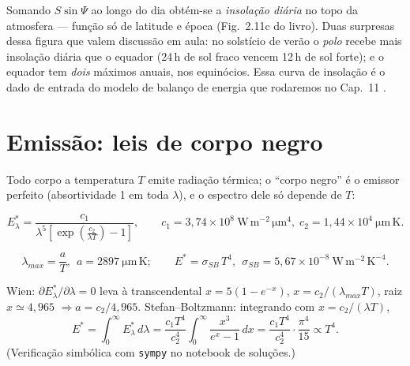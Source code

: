 \documentclass[11pt]{article}
\begin{document}
Somando $S\sin\Psi$ ao longo do dia obtém-se a \emph{insolação diária} no
topo da atmosfera — função só de latitude e época (Fig.~2.11c do livro).
Duas surpresas dessa figura que valem discussão em aula: no solstício de
verão o \emph{polo} recebe mais insolação diária que o equador (24\,h de
sol fraco vencem 12\,h de sol forte); e o equador tem \emph{dois} máximos
anuais, nos equinócios. Essa curva de insolação é o dado de entrada do
modelo de balanço de energia que rodaremos no Cap.~11
.

\section{Emissão: leis de corpo negro}\label{sec:corpo}


Todo corpo a temperatura $T$ emite radiação térmica; o ``corpo negro'' é o
emissor perfeito (absortividade 1 em toda $\lambda$), e o espectro dele só
depende de $T$:

\begin{formalivro}
\[ E^*_\lambda = \frac{c_1}{\lambda^5\left[\exp\!\left(\frac{c_2}{\lambda T}\right)-1\right]},
\qquad c_1 = 3{,}74\times10^{8}\ \mathrm{W\,m^{-2}\,\mu m^{4}},\;
        c_2 = 1{,}44\times10^{4}\ \mathrm{\mu m\,K}. \]
\end{formalivro}

\begin{formalivro}
\[ \lambda_{max} = \frac{a}{T},\ \ a = 2897\ \mathrm{\mu m\,K};
\qquad E^* = \sigma_{SB}\,T^4,\ \ \sigma_{SB} = 5{,}67\times10^{-8}\ \mathrm{W\,m^{-2}\,K^{-4}}. \]
\end{formalivro}

\begin{formadif}
Wien: $\partial E^*_\lambda/\partial\lambda = 0$ leva à transcendental
$x = 5(1-e^{-x})$, $x = c_2/(\lambda_{max}T)$, raiz $x \simeq 4{,}965$
$\Rightarrow a = c_2/4{,}965$.
Stefan--Boltzmann: integrando com $x = c_2/(\lambda T)$,
\[ E^* = \int_0^\infty E^*_\lambda\,d\lambda
 = \frac{c_1 T^4}{c_2^4}\int_0^\infty\!\frac{x^3}{e^x-1}\,dx
 = \frac{c_1 T^4}{c_2^4}\cdot\frac{\pi^4}{15} \propto T^4. \]
(Verificação simbólica com \texttt{sympy} no notebook de soluções.)
\end{formadif}
\end{document}
